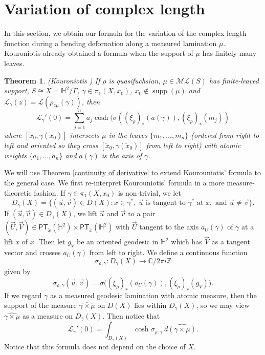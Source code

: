 \documentclass{amsart}
\theoremstyle{plain}
\newtheorem{theorem}[proposition]{Theorem}
\theoremstyle{definition}
\theoremstyle{remark}
\newcommand{\Hp}{{\mathbb H}^2}
\newcommand{\supp}{{\operatorname{supp}}}
\renewcommand{\sf}[1]{{\mathsf{#1}}}
\newcommand{\<}{\left <}
\renewcommand{\>}{\right >}
\begin{document}
 \section{Variation of complex length}
 
In this section, we obtain our formula for the variation of the complex length function during a bending defornation along a measured
lamination $\mu$. Kouroniotis \cite{kouron} already obtained a formula 
when the support of $\mu$ has finitely many leaves.
 

\begin{theorem}{\rm (Kouroniotis \cite[Thm 4.1]{kouron})}
\label{finite derivative of complex length}
If $\rho$ is quasifuchsian, $\mu\in \mathcal{ML}(S)$ has finite-leaved support, $S\cong X=\mathbb H^2/\Gamma$,
$\gamma\in \pi_1(X,x_0)$, $x_0\notin\supp(\mu)$ and
$\mathcal L_\gamma(z)=\mathcal L(\rho_{z\mu}(\gamma))$, then
$$\mathcal L_\gamma'(0) = \sum_{j=1}^n a_j\cosh(\sigma((\xi_\rho)_*(a(\gamma)),(\xi_\rho)_*(m_j))$$
where $[\tilde x_0,\gamma(\tilde x_0)]$ intersects $\tilde\mu$ in the leaves $\{m_1,\ldots,m_n\}$ (ordered from right to left and oriented so they
cross $[\tilde x_0,\gamma(\tilde x_0)]$ from left to right) with atomic weights
$\{a_1,\ldots,a_n\}$ and $a(\gamma)$ is the axis of $\gamma$.
\end{theorem}

We will use Theorem \ref{continuity of derivative} to extend Kourouniotis' formula to the general case.
We first re-interpret Kourouniotis' formula in a more measure-theoretic fashion. If
$\gamma\in \pi_1(X,x_0)$ is non-trivial, we let 
$$D_\gamma(X)=\{(\vec u,\vec v)\in D(X) : x\in\gamma^*,\ \vec u \text{ is tangent to } \gamma^*\text{ at } x, \text{ and } \vec u\ne\vec v\}.$$
If $(\vec u,\vec v)\in D_\gamma(X)$, we lift $\vec u$ and $\vec v$ to a pair $(\vec U,\vec V) \in \sf{PT}_{\tilde x}(\Hp)\times \sf{PT}_{\tilde x}(\Hp)$
with  $ \vec U$ tangent to the axis $a_U(\gamma)$ of $\gamma$ at  a lift $\tilde x$ of $x$. 
Then let $g_V$ be an oriented geodesic in $\mathbb H^2$ which has $\vec V$ as a tangent
vector and crosses $a_U(\gamma)$ from left to right.
We define a continuous function
$$\sigma_{\rho,\gamma}:D_\gamma(X)\to \mathbb C/2\pi i \mathbb Z$$
given by 
$$\sigma_{\rho,\gamma}(\vec u,\vec v)=\sigma\Big((\xi_\rho)_*(a_U(\gamma)),(\xi_\rho)_*(g_V)\Big).$$
If we regard $\gamma$ as a measured geodesic lamination with atomic measure, then the support of
the measure $\widehat{\gamma\times\mu}$ on $D(X)$ lies within $D_\gamma(X)$, so we may
view $\widehat{\gamma\times\mu}$ as a measure on $D_\gamma(X)$. Then notice that 
$$\mathcal L_\gamma'(0)=\int_{D_\gamma(X)} \cosh \sigma_{\rho,\gamma}\ d\widehat{(\gamma\times\mu)}.$$
Notice that this formula does not depend on the choice of $X$.
\end{document}
